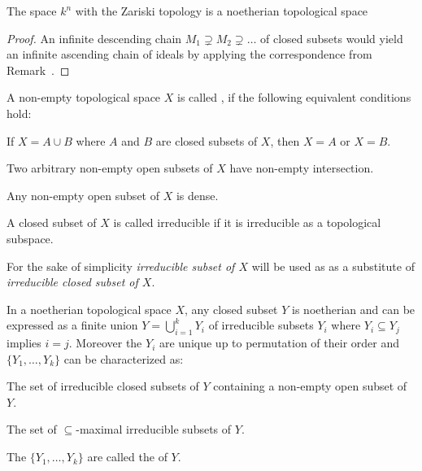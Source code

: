 \documentclass[a4paper,parskip=half,numbers=enddot, DIV=12]{scrreprt}
\begin{document}
	\begin{cor}
		The space $k^n$ with the Zariski topology is a noetherian topological space
	\end{cor}
	\begin{proof}
		An infinite descending chain $M_1\supsetneq M_2\supsetneq\ldots$ of closed subsets would yield an infinite ascending chain of ideals by applying the correspondence from Remark~.
	\end{proof}
	\begin{defi}
		A non-empty topological space $X$ is called ,  if the following equivalent conditions hold:
		\begin{alphanumerate}
			\item If $X=A\cup B$ where $A$ and $B$ are closed subsets of $X$, then $X=A$ or $X=B$. 
			\item Two arbitrary non-empty open subsets of $X$ have non-empty intersection.
			\item Any non-empty open subset of $X$ is dense.
		\end{alphanumerate}
		A closed subset of $X$ is called irreducible if it is irreducible as a topological subspace.
	\end{defi}
	\begin{rem}[a.k.a. Remark 4]
		For the sake of simplicity \emph{irreducible subset of $X$} will be used as as a substitute of \emph{irreducible closed subset of $X$}.
	\end{rem}
	\begin{prop}[a.k.a. Proposition 2]
		In a noetherian topological space $X$, any closed subset $Y$ is noetherian and can be expressed as a finite union $Y= \bigcup_{i=1}^k Y_i$ of irreducible subsets $Y_i$ where $Y_i\subseteq Y_j$ implies $i=j$. Moreover the $Y_i$ are unique up to permutation of their order and $\{Y_1,\ldots, Y_k\}$ can be characterized as:
		\begin{alphanumerate}
			\item The set of irreducible closed subsets of $Y$ containing a non-empty open subset of $Y$.
			\item The set of $\subseteq$-maximal irreducible subsets of $Y$.
		\end{alphanumerate}
		The $\{Y_1,\ldots, Y_k\}$ are called the  of $Y$.
	\end{prop}
\end{document}
